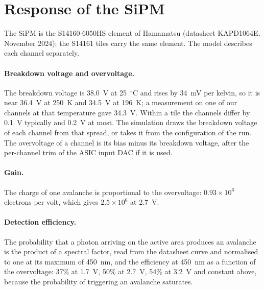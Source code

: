 \documentclass[11pt]{article}
\begin{document}
\section{Response of the SiPM}
\label{sec:sipm}

The SiPM is the S14160-6050HS element of Hamamatsu (datasheet KAPD1064E,
November 2024); the S14161 tiles carry the same element. The model describes
each channel separately.

\paragraph{Breakdown voltage and overvoltage.} The breakdown voltage is
38.0~V at 25~$^\circ$C and rises by 34~mV per kelvin, so it is near 36.4~V at
250~K and 34.5~V at 196~K; a measurement on one of our channels at that temperature gave
34.3~V. Within a tile the channels differ by 0.1~V typically and 0.2~V at
most. The simulation draws the breakdown voltage of each channel from that
spread, or takes it from the configuration of the run. The overvoltage of a channel is its bias minus its
breakdown voltage, after the per-channel trim of the ASIC input DAC if it is
used.

\paragraph{Gain.} The charge of one avalanche is proportional to the
overvoltage: $0.93 \times 10^6$ electrons per volt, which gives
$2.5 \times 10^6$ at 2.7~V.

\paragraph{Detection efficiency.} The probability that a photon arriving on
the active area produces an avalanche is the product of a spectral factor,
read from the datasheet curve and normalised to one at its maximum of
450~nm, and the efficiency at 450~nm as a function of the overvoltage: 37\%
at 1.7~V, 50\% at 2.7~V, 54\% at 3.2~V and constant above, because the
probability of triggering an avalanche saturates.
\end{document}
